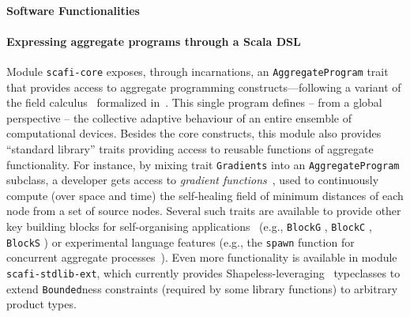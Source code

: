 \paragraph{Software Functionalities}
\label{}

%

\paragraph*{Expressing aggregate programs through a Scala DSL}
\label{sec:express-programs}
%
Module \texttt{scafi-core}
 exposes,
 through incarnations,
 an \texttt{AggregateProgram} trait
  that provides access to 
  aggregate programming constructs---following 
  a variant of the field calculus~\cite{DBLP:journals/tocl/AudritoVDPB19,DBLP:journals/jlap/ViroliBDACP19}
  formalized in~\cite{DBLP:conf/isola/CasadeiVAD20,arxiv2020scafi-nc}.
%
This single program defines -- from a global perspective -- 
 the collective adaptive behaviour 
 of an entire %
 ensemble of computational devices.
%
Besides the core constructs,
 this module also provides ``standard library'' traits
 providing access to reusable functions of aggregate functionality.
%
For instance, by mixing trait \texttt{Gradients}
 into an \texttt{AggregateProgram} subclass,
 a developer gets access to \emph{gradient functions}~, used to 
 continuously compute (over space and time) the self-healing field of minimum distances of each node from a set of source nodes. %
%
Several such traits are available
 to provide other key building blocks
 for self-organising applications~ (e.g., \texttt{BlockG} , \texttt{BlockC} , \texttt{BlockS} )
 or experimental language features
 (e.g., the \texttt{spawn} function for concurrent aggregate processes~).
%
Even more functionality is available in module \texttt{scafi-stdlib-ext}, which currently provides Shapeless-leveraging~\cite{gurnell2017shapeless} typeclasses to extend \texttt{Bounded}ness constraints 
 (required by some library functions) to arbitrary product types.

